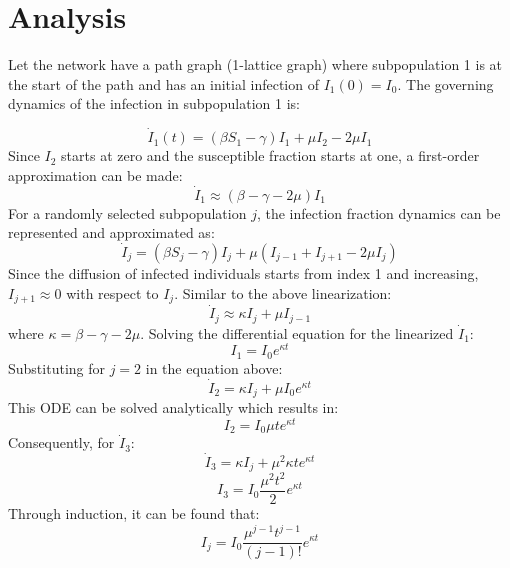 \documentclass{article}
\begin{document}
\section{Analysis}

\begin{center}
\end{center}
Let the network have a path graph (1-lattice graph) where subpopulation 1 is at the start of the path and has an initial infection of $I_1(0)=I_0$. The governing dynamics of the infection in subpopulation 1 is:

\begin{equation}
\dot I_1(t)=(\beta S_1-\gamma)I_1+\mu I_2-2\mu I_1
\end{equation}
Since $I_2$ starts at zero and the susceptible fraction starts at one, a first-order approximation can be made:
\begin{equation}
\dot I_1 \approx (\beta-\gamma-2\mu)I_1
\end{equation}
For a randomly selected subpopulation $j$, the infection fraction dynamics can be represented and approximated as:
\begin{equation}
\dot I_j =(\beta S_j-\gamma)I_j+\mu (I_{j-1}+I_{j+1}-2\mu I_j)
\end{equation}
Since the diffusion of infected individuals starts from index 1 and increasing, $I_{j+1} \approx 0$ with respect to $I_j$. Similar to the above linearization:
\begin{equation}
\dot I_j \approx \kappa I_j+\mu I_{j-1}
\end{equation}
where $\kappa = \beta-\gamma-2\mu$. Solving the differential equation for the linearized $\dot I_1$:
\begin{equation}
I_1 = I_0 e^{\kappa t}
\end{equation}
Substituting for $j=2$ in the equation above:
\begin{equation}
\dot I_2=\kappa I_j +\mu I_0 e^{\kappa t}
\end{equation}
This ODE can be solved analytically which results in:
\begin{equation}
I_2=I_0 \mu t e^{\kappa t}  
\end{equation}
Consequently, for $\dot I_3$:
\begin{equation}
\dot I_3=\kappa I_j +\mu^2 \kappa t e^{\kappa t}
\end{equation}
\begin{equation}
I_3 = I_0 \frac{\mu^2 t^2}{2} e^{\kappa t}
\end{equation}
Through induction, it can be found that:
\begin{equation}
I_j=I_0 \frac{\mu^{j-1} t^{j-1}}{(j-1)!} e^{\kappa t}
\end{equation}
\end{document}
